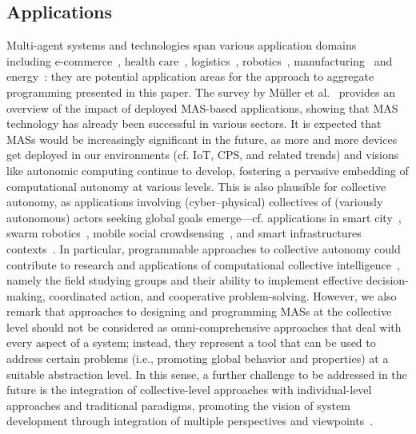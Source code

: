 \documentclass[jsan,article,accept,moreauthors,pdftex]{Definitions/mdpi}
\begin{document}
\begin{paracol}{2}


\subsection{Applications}\label{roadmap:apps}

Multi-agent systems and technologies span various application domains~\cite{DBLP:books/sp/14/Muller014}
 including %
 e-commerce~\cite{fasli2007agent-ecommerce}, health care~\cite{bergenti2009mas-ehealth}, logistics~\cite{DBLP:journals/iee/BurmeisterHM97}, robotics~\cite{DBLP:journals/arobots/DudekJMW96}, manufacturing~\cite{lee2008mas-manufacturing} and energy~\cite{gonzalez2018mas-energy,DBLP:conf/icmcs2/MerabetETAKMB14}: they are potential application areas for the approach to aggregate programming presented in this paper.
%
The survey by M{\"u}ller et al.~\cite{DBLP:books/sp/14/Muller014}
 provides an overview of the impact of deployed MAS-based applications,
 showing that MAS technology has already been successful in various sectors.
%
It is expected that MASs would be increasingly significant in the future, as more and more devices get deployed in our environments (cf. IoT, CPS, and related trends) and visions like autonomic computing continue to develop,
fostering a pervasive embedding of computational autonomy at various levels. 
%
This is also plausible for collective autonomy,
 as applications involving (cyber--physical) collectives
 of (variously autonomous) actors seeking global goals
 emerge---cf. applications
 in smart city~\cite{DBLP:journals/iotj/ZanellaBCVZ14}, 
 swarm robotics~\cite{DBLP:journals/swarm/BrambillaFBD13}, 
 mobile social crowdsensing~\cite{DBLP:journals/cm/GantiYL11,DBLP:journals/tasm/BucchiaroneDPCS20},
 and smart infrastructures contexts~\cite{DBLP:journals/arc/AnnaswamyMB16,casadei2019fmec}.
%
In particular,
 programmable approaches to collective autonomy 
 could contribute to 
 research and applications of {computational collective intelligence}~\cite{szuba2001computational-collective},
 namely the field studying groups and their ability 
 to implement effective decision-making, coordinated action, and cooperative problem-solving.
%
However, we also remark that 
 approaches to designing and programming 
 MASs at the collective level 
 should not be considered as 
 omni-comprehensive approaches
 that deal with every aspect of a system;
 instead,
 they represent a tool that can be used
 to address certain problems
 (i.e., promoting global behavior and properties)
 at a suitable abstraction level.
%
In this sense, 
 a further challenge to be addressed in the future
 is the integration of collective-level approaches
 with individual-level approaches and traditional paradigms,
 promoting the vision of system development through
 integration of multiple perspectives and viewpoints~\cite{DBLP:journals/ijseke/FinkelsteinKNFG92}.



\end{paracol}
\end{document}
